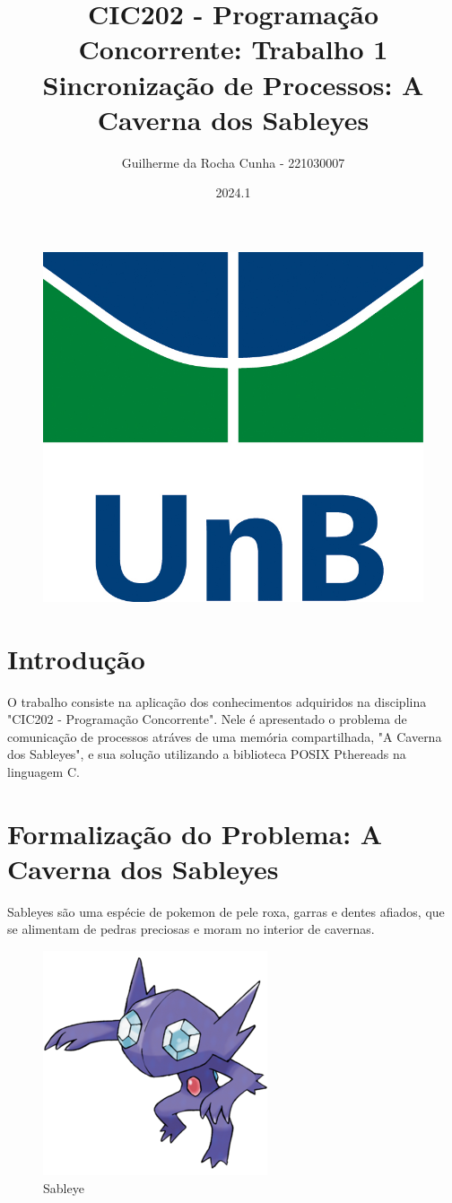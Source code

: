 \documentclass{article}
\title{CIC202 - Programação Concorrente: Trabalho 1 \\
        \large \textbf{Sincronização de Processos:} A Caverna dos Sableyes}
\author{Guilherme da Rocha Cunha - 221030007}
\date{2024.1}
\begin{document}
\pagestyle{fancy}

\maketitle

\begin{figure}[ht]
        \centering
        \includegraphics[width=.5\textwidth]{imagens/as_vert_cor.jpg}
\end{figure}

\newpage

\fancyhead{}
\fancyfoot[C]{\thepage}


\renewcommand*\contentsname{Sumário}
\tableofcontents

\newpage

\section{Introdução}
O trabalho consiste na aplicação dos conhecimentos adquiridos na disciplina "CIC202 - Programação Concorrente". Nele é apresentado o problema de comunicação de processos atráves de uma memória compartilhada, "A Caverna dos Sableyes", e sua solução utilizando a biblioteca POSIX Pthereads na linguagem C.

\section{Formalização do Problema: A Caverna dos Sableyes}
Sableyes são uma espécie de pokemon de pele roxa, garras e dentes afiados, que se alimentam de pedras preciosas e moram no interior de cavernas.

\begin{figure}[ht]
        \centering
        \includegraphics[width = .25\textwidth]{imagens/sableye.png}
        \caption{Sableye}
\end{figure}
\end{document}
